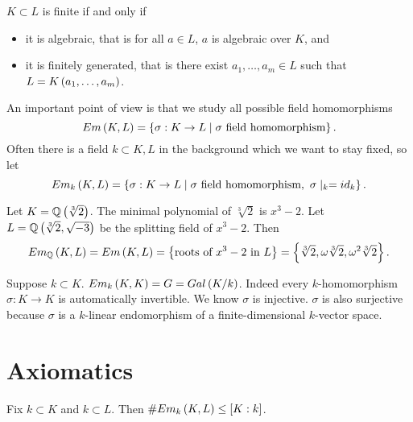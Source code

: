\begin{remark*}
$ K \subset L $ is finite if and only if
\begin{itemize}
\item it is algebraic, that is for all $ a \in L $, $ a $ is algebraic over $ K $, and
\item it is finitely generated, that is there exist $ a_1, \dots, a_m \in L $ such that $ L = K\left( a_1, \dots, a_m \right) $.
\end{itemize}
\end{remark*}

An important point of view is that we study all possible field homomorphisms
$$ Em\left( K, L \right) = \left\{ \sigma : K \to L \mid \sigma \ \text{field homomorphism} \right\}. $$
Often there is a field $ k \subset K, L $ in the background which we want to stay fixed, so let
$$ Em_k\left( K, L \right) = \left\{ \sigma : K \to L \mid \sigma \ \text{field homomorphism}, \ \sigma \mid_k = id_k \right\}. $$

\begin{example*}
Let $ K = \mathbb{Q}\left( \sqrt[3]{2} \right) $. The minimal polynomial of $ \sqrt[3]{2} $ is $ x^3 - 2 $. Let $ L = \mathbb{Q}\left( \sqrt[3]{2}, \sqrt{-3} \right) $ be the splitting field of $ x^3 - 2 $. Then
$$ Em_{\mathbb{Q}}\left( K, L \right) = Em\left( K, L \right) = \left\{ \text{roots of} \ x^3 - 2 \ \text{in} \ L \right\} = \left\{ \sqrt[3]{2}, \omega\sqrt[3]{2}, \omega^2\sqrt[3]{2} \right\}. $$
\end{example*}

\begin{remark*}
Suppose $ k \subset K $. $ Em_k\left( K, K \right) = G = Gal\left( K / k \right) $. Indeed every $ k $-homomorphism $ \sigma : K \to K $ is automatically invertible. We know $ \sigma $ is injective. $ \sigma $ is also surjective because $ \sigma $ is a $ k $-linear endomorphism of a finite-dimensional $ k $-vector space.
\end{remark*}

\pagebreak

\section{Axiomatics}

\begin{proposition}
\label{prop:1}
Fix $ k \subset K $ and $ k \subset L $. Then $ \#Em_k\left( K, L \right) \le \left[ K : k \right] $.
\end{proposition}

